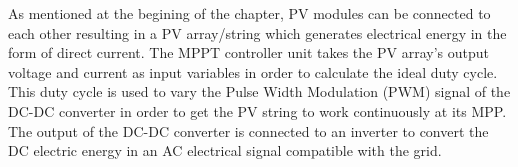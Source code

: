 As mentioned at the begining of the chapter, PV modules can be connected to each other resulting in a PV array/string which generates electrical energy in the form of direct current. The MPPT controller unit takes the PV array's output voltage and current as input variables in order to calculate the ideal duty cycle. This duty cycle is used to vary the Pulse Width Modulation (PWM) signal of the DC-DC converter in order to get the PV string to work continuously at its MPP. The output of the DC-DC converter is connected to an inverter to convert the DC electric energy in an AC electrical signal compatible with the grid. 

